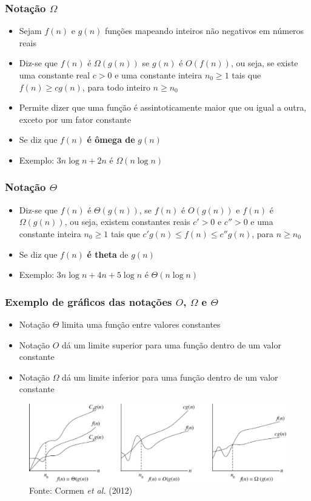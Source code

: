 \documentclass[aspectratio=169]{beamer}
\begin{document}
\begin{frame}\frametitle{Notação $\Omega$}
\begin{itemize}
	\item Sejam $f(n)$ e $g(n)$ funções mapeando inteiros não negativos em números reais
	\item Diz-se que $f(n)$ é $\Omega(g(n))$ se $g(n)$ é $O(f(n))$, ou seja, se existe uma constante real $c > 0$ e uma constante inteira $n_0 \ge 1$ tais que $f(n) \ge cg(n)$, para todo inteiro $n \ge n_0$
	\item Permite dizer que uma função é assintoticamente maior que ou igual a outra, exceto por um fator constante
	\item Se diz que $f(n)$ \textbf{é ômega de} $g(n)$
	\item Exemplo: $3n\log{n} + 2n$ é $\Omega(n\log{n})$
\end{itemize}
\end{frame}

\begin{frame}\frametitle{Notação $\Theta$}
\begin{itemize}
	\item Diz-se que $f(n)$ é $\Theta(g(n))$, se $f(n)$ é $O(g(n))$ e $f(n)$ é $\Omega(g(n))$, ou seja, existem constantes reais $c' > 0$ e $c'' > 0$ e uma constante inteira $n_0 \ge 1$ tais que $c'g(n) \le f(n) \le c''g(n)$, para $n \ge n_0$
	\item Se diz que $f(n)$ \textbf{é theta} de $g(n)$
	\item Exemplo: $3n\log{n} + 4n + 5 \log{n}$ é $\Theta(n\log{n})$
\end{itemize}
\end{frame}

\begin{frame}\frametitle{Exemplo de gráficos das notações $O$, $\Omega$ e $\Theta$}
\begin{itemize}
	\item Notação $\Theta$ limita uma função entre valores constantes
	\item Notação $O$ dá um limite superior para uma função dentro de um valor constante
	\item Notação $\Omega$ dá um limite inferior para uma função dentro de um valor constante
		\end{itemize}
\begin{figure}[h]
	\centering
	\includegraphics[height=0.5\paperheight]{imagens/notacoes.jpg}
\tiny{Fonte: Cormen \emph{et al.} (2012)}
\end{figure}
\end{frame}
\end{document}
